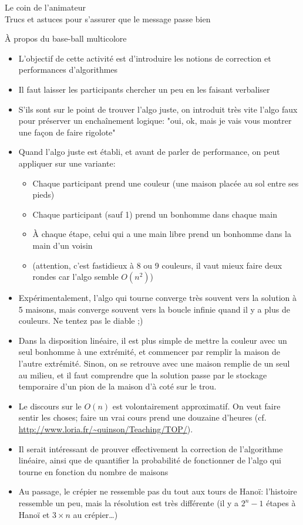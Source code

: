\begin{frame}{Le coin de l'animateur\\[-5pt]
  {\large Trucs et astuces pour s'assurer que le message passe bien}}
  \begin{block}{À propos du base-ball multicolore}
    \begin{itemize}
    \item L'objectif de cette activité est d'introduire les notions de
      correction et performances d'algorithmes
    \item Il faut laisser les participants chercher un peu en les faisant verbaliser
    \item S'ils sont sur le point de trouver l'algo juste, on introduit très
      vite l'algo faux pour préserver un enchaînement logique: "oui, ok, mais
      je vais vous montrer une façon de faire rigolote"
    \item Quand l'algo juste est établi, et avant de parler de performance, on
      peut appliquer sur une variante:\vspace{-\baselineskip}
      \begin{itemize}
      \item Chaque participant prend une couleur (une maison placée au sol entre ses pieds)
      \item Chaque participant (sauf 1) prend un bonhomme dans chaque main
      \item À chaque étape, celui qui a une main libre prend un bonhomme dans la main d'un voisin
      \item (attention, c'est fastidieux à 8 ou 9 couleurs, il vaut mieux faire
        deux rondes car l'algo semble $O(n^2)$)
      \end{itemize}
    \item Expérimentalement, l'algo qui tourne converge très souvent vers la
      solution à 5 maisons, mais converge souvent vers la boucle infinie quand
      il y a plus de couleurs. Ne tentez pas le diable ;)
    \item Dans la disposition linéaire, il est plus simple de mettre la couleur
      avec un seul bonhomme à une extrémité, et commencer par remplir la maison
      de l'autre extrémité. Sinon, on se retrouve avec une maison remplie de un
      seul au milieu, et il faut comprendre que la solution passe par le
      stockage temporaire d'un pion de la maison d'à coté sur le trou.
    \item Le discours sur le $O(n)$ est volontairement approximatif. On veut
      faire sentir les choses; faire un vrai cours prend une douzaine d'heures
      (cf. \url{http://www.loria.fr/~quinson/Teaching/TOP/}).
    \item Il serait intéressant de prouver effectivement la correction de
      l'algorithme linéaire, ainsi que de quantifier la probabilité de
      fonctionner de l'algo qui tourne en fonction du nombre de maisons
    \item Au passage, le crépier ne ressemble pas du tout aux tours de Hanoï:
      l'histoire ressemble un peu, mais la résolution est très différente (il y
      a $2^n-1$ étapes à Hanoï et $3\times n$ au crépier\ldots)
    \end{itemize}
  \end{block}
\end{frame}
